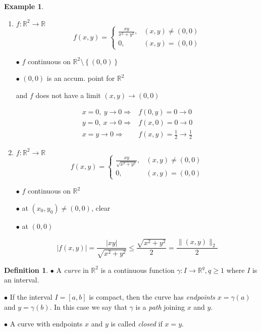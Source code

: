 \documentclass[12pt]{amsbook}
\theoremstyle{definition}
\newtheorem{definition}[theorem]{Definition}
\newtheorem{example}[theorem]{Example}
\newcommand{\RR}{{\mathbb R}}
\newcommand{\Ra}{\Rightarrow} %
\newcommand{\ra}{\rightarrow} %
\begin{document}
\begin{example}
\begin{enumerate}
\item $f: \RR^2 \ra \RR$
\begin{equation*}
f(x,y) =\left\{\begin{array}{ll} \frac{xy}{x^2+y^2}, & (x,y) \neq (0,0) \\ 0, & (x,y) = (0,0) \end{array} \right.
\end{equation*}

$\bullet$ $f$ continuous on $\RR^2 \setminus \left\{(0,0)\right\}$

$\bullet$  $(0,0)$ is an accum. point for $\RR^2$

and $f$ does not have a limit $(x,y) \ra (0,0)$

\begin{align} \nonumber
x = 0, \ y \ra 0 \Ra & f(0,y) = 0 \ra 0 \\ \nonumber
y = 0, \ x \ra 0 \Ra & f(x,0) = 0 \ra 0 \\ \nonumber
x = y \ra 0 \Ra & f(x,y) = \frac{1}{2} \ra \frac{1}{2}
\end{align}

\item $f: \RR^2 \ra \RR$
\begin{equation*}
f(x,y) =\left\{\begin{array}{ll} \frac{xy}{\sqrt{x^2+y^2}}, & (x,y) \neq (0,0) \\ 0, & (x,y) = (0,0) \end{array} \right.
\end{equation*}

$\bullet$ $f$ continuous on $\RR^2$

$\bullet$ at $(x_0, y_0) \neq (0,0)$, clear

$\bullet$ at $(0,0)$

\begin{equation*}
|f(x,y)| = \frac{|xy|}{\sqrt{x^2+y^2}} \leq \frac{\sqrt{x^2+y^2}}{2} = \frac{\|(x,y)\|_2}{2}
\end{equation*}

\end{enumerate}
\end{example}


\begin{definition}
$\bullet$ A \emph{curve} in $\RR^2$ is a continuous function $\gamma: I \ra \RR^q, q \geq 1$ where $I$ is an interval.

$\bullet$ If the interval $I = [a, b]$ is compact, then the curve has \emph{endpoints} $x = \gamma(a)$ and $y = \gamma(b)$. In this case we say that $\gamma$ is a \emph{path} joining $x$ and $y$.

$\bullet$ A curve with endpoints $x$ and $y$ is called \emph{closed} if $x = y$.
\end{definition}
\end{document}
